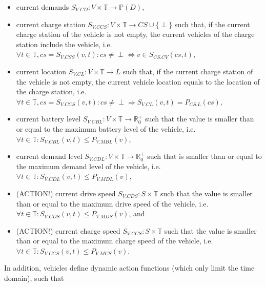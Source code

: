 \documentclass[graybox]{svmult}
\begin{document}
\begin{itemize}
	\item current demands $S_{V.CD}: V \times \mathbb{T} \rightarrow \mathbb{P}(D)$,
	\item current charge station $S_{V.CCS}: V \times \mathbb{T} \rightarrow CS \cup \{\perp\}$ such that, if the current charge station of the vehicle is not empty, the current vehicles of the charge station include the vehicle, i.e.\ $\forall t \in \mathbb{T}, cs = S_{V.CSS}(v,t): cs \neq \perp \Leftrightarrow v \in S_{CS.CV}(cs,t)$,
	\item current location $S_{V.CL}: V \times \mathbb{T} \rightarrow L$ such that, if the current charge station of the vehicle is not empty, the current vehicle location equals to the location of the charge station, i.e.\ $\forall t \in \mathbb{T}, cs = S_{V.CCS}(v,t): cs \neq \perp \Rightarrow S_{V.CL}(v,t)=P_{CS.L}(cs)$,
	\item current battery level $S_{V.CBL}: V \times \mathbb{T} \rightarrow \mathbb{R}_0^+$ such that the value is smaller than or equal to the maximum battery level of the vehicle, i.e.\ $\forall t \in \mathbb{T}: S_{V.CBL}(v,t) \leq P_{V.MBL}(v)$,
	\item current demand level $S_{V.CDL}: V \times \mathbb{T} \rightarrow \mathbb{R}_0^+$ such that is smaller than or equal to the maximum demand level of the vehicle, i.e.\ $\forall t \in \mathbb{T}: S_{V.CDL}(v,t) \leq P_{V.MDL}(v)$,
	\item (ACTION!) current drive speed $S_{V.CDS}: S \times \mathbb{T}$ such that the value is smaller than or equal to the maximum drive speed of the vehicle, i.e.\ $\forall t \in \mathbb{T}: S_{V.CDS}(v,t) \leq P_{V.MDS}(v)$, and
	\item (ACTION!) current charge speed $S_{V.CCS}: S \times \mathbb{T}$ such that the value is smaller than or equal to the maximum charge speed of the vehicle, i.e.\ $\forall t \in \mathbb{T}: S_{V.CCS}(v,t) \leq P_{V.MCS}(v)$.
\end{itemize}

\noindent
In addition, vehicles define dynamic action functions (which only limit the time domain), such that
\end{document}

